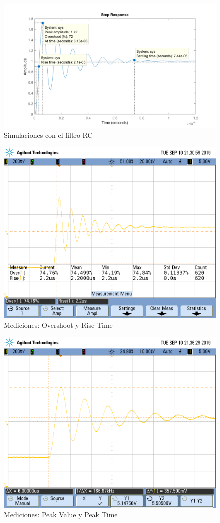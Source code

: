 \documentclass{article}
\begin{document}
\begin{figure}[H]
\centering
\includegraphics[width=1\linewidth]{images/todo.PNG}
\caption{Simulaciones con el filtro RC}
\label{fig:sim}
\end{figure}

\begin{figure}[H]
\centering
\includegraphics[width=0.8\linewidth]{images/os_and_trise.PNG}
\caption{Mediciones: Overshoot y Rise Time}
\label{fig:osandtr}
\end{figure}

\begin{figure}[H]
\centering
\includegraphics[width=0.8\linewidth]{images/tpeak_vpeak.PNG}
\caption{Mediciones: Peak Value y Peak Time}
\label{fig:peak}
\end{figure}
\end{document}
